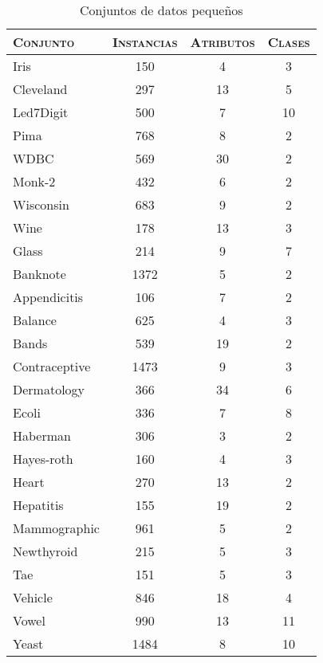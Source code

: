 \begin{table}[]
\centering
\begin{tabular}{l c c c}
\hline
\textsc{Conjunto} & \textsc{Instancias} & \textsc{Atributos} & \textsc{Clases} \\
\hline
\hline

Iris          & 150  &  4 &  3 \\
Cleveland     & 297  & 13 &  5 \\
Led7Digit     & 500  &  7 & 10 \\
Pima          & 768  &  8 &  2 \\
WDBC          & 569  & 30 &  2 \\
Monk-2        & 432  &  6 &  2 \\
Wisconsin     & 683  &  9 &  2 \\
Wine          & 178  & 13 &  3 \\
Glass         & 214  &  9 &  7 \\
Banknote      & 1372 &  5 &  2 \\
Appendicitis  & 106  &  7 &  2 \\
Balance       & 625  &  4 &  3 \\
Bands         & 539  & 19 &  2 \\
Contraceptive & 1473 & 9  &  3 \\
Dermatology   &  366 & 34 &  6 \\
Ecoli         &  336 &  7 &  8 \\
Haberman      &  306 & 3  &  2 \\
Hayes-roth    &  160 & 4  &  3 \\
Heart         &  270 & 13 &  2 \\
Hepatitis     &  155 & 19 &  2 \\
Mammographic  &  961 & 5  &  2 \\
Newthyroid    &  215 & 5  &  3 \\
Tae           &  151 & 5  &  3 \\
Vehicle       &  846 & 18 &  4 \\
Vowel         &  990 & 13 & 11 \\
Yeast         & 1484 & 8  & 10 \\
 
\hline
\end{tabular}
\caption{Conjuntos de datos pequeños}
\label{pequenios}
\end{table}

